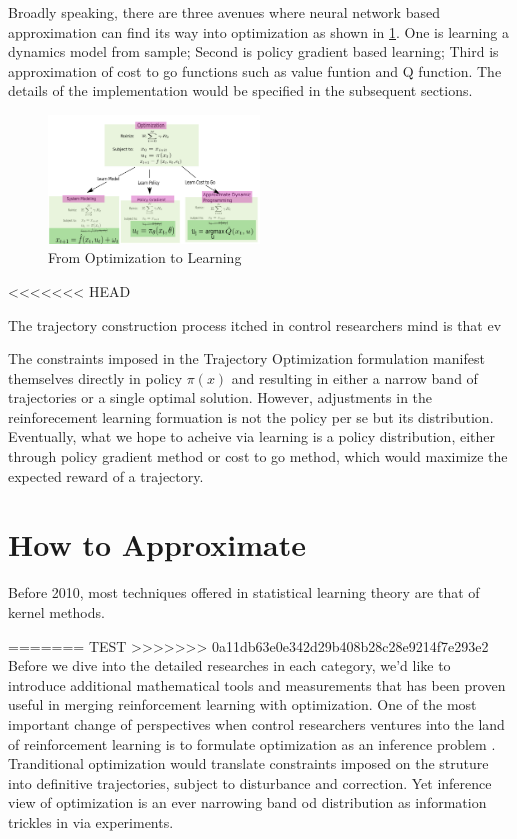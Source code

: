 \documentclass[journal]{IEEEtran}
\begin{document}
Broadly speaking, there are three avenues where neural network based approximation can find its way into optimization as shown in \ref{fig:1}. One is learning a dynamics model from sample; Second is policy gradient based learning; Third is approximation of cost to go functions such as value funtion and Q function. The details of the implementation would be specified in the subsequent sections.

\begin{figure}[H]
    \centering
    \includegraphics[width=0.5\textwidth]{Control.png}
    \caption{From Optimization to Learning}
    \label{fig:1}
\end{figure}
<<<<<<< HEAD

The trajectory construction process itched in control researchers mind is that ev

The constraints imposed in the Trajectory Optimization formulation manifest themselves directly in policy $\pi(x)$ and resulting in either a narrow band of trajectories or a single optimal solution. However, adjustments in the reinforecement learning formuation is not the policy per se but its distribution. Eventually, what we hope to acheive via learning is a policy distribution, either through policy gradient method or cost to go method, which would maximize the expected reward of a trajectory.

\section{How to Approximate}
Before 2010, most techniques offered in statistical learning theory are that of kernel methods.
















=======
TEST
>>>>>>> 0a11db63e0e342d29b408b28c28e9214f7e293e2
Before we dive into the detailed researches in each category, we'd like to introduce additional mathematical tools and measurements that has been proven useful in merging reinforcement learning with optimization. One of the most important change of perspectives when control researchers ventures into the land of reinforcement learning is to formulate optimization as an inference problem \cite{Levine2018ReinforcementLA}. Tranditional optimization would translate constraints imposed on the struture into definitive trajectories, subject to disturbance and correction. Yet inference view of optimization is an ever narrowing band od distribution as information trickles in via experiments.
\end{document}
